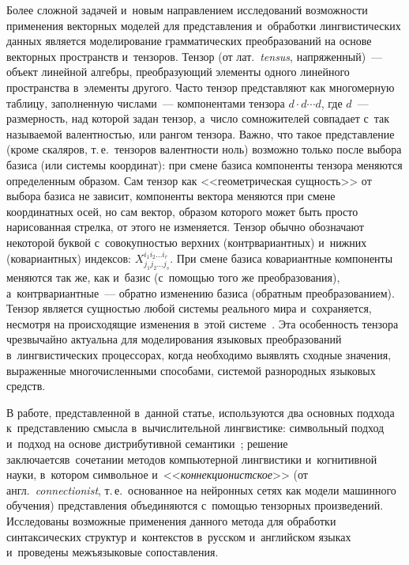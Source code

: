 \begin{multicols}{2}
     Более сложной задачей и~новым направлением исследований 
возможности применения векторных моделей для пред\-став\-ле\-ния и~обработки 
лингвистических данных является моделирование грамматических 
преобразований на основе векторных пространств и~тензоров. Тензор (от 
лат.\ \textit{tensus}, напряженный)~--- объект линейной алгебры, пре\-об\-ра\-зу\-ющий 
элементы одного линейного пространства в~элементы другого. Часто тензор 
представляют как многомерную таб\-ли\-цу, заполненную чис\-ла\-ми~--- 
компонентами тензора $d \cdot d \cdots d$, где $d$~--- раз\-мер\-ность, 
над которой задан тензор, а~чис\-ло сомножителей совпадает с~так называемой 
валентностью, или рангом тензора. Важно, что такое представление (кроме 
скаляров, т.\,е.\ тензоров валентности ноль) возможно только после выбора 
базиса (или системы координат): при смене базиса компоненты тензора 
меняются определенным образом. Сам тензор как <<геометрическая 
сущность>> от выбора базиса не зависит, компоненты вектора меняются при 
смене координатных осей, но сам вектор, образом которого может быть 
прос\-то нарисованная стрелка, от этого не изменяется. Тензор обычно 
обозначают некоторой буквой с~совокупностью верх\-них (контрвариантных) и~ниж\-них (ковариантных) индексов: $X_{j_1 j_2\ldots j_s}^{i_1i_2\ldots i_r}$. 
При смене базиса ковариантные компоненты меняются так же, как и~базис 
(с~по\-мощью того же преобразования), а~контрвариантные~--- обратно 
изменению базиса (обратным преобразованием). Тензор является сущностью 
любой системы реального мира и~сохраняется, несмотря на происходящие 
изменения в~этой системе~\cite{9-koz}. Эта особенность тензора чрезвычайно 
актуальна для моделирования языковых преобразований в~лингвистических 
процессорах, когда необходимо выявлять сходные значения, выраженные 
многочисленными способами, сис\-те\-мой разнородных языковых средств. 
     
     В работе, представленной в~данной статье, используются два основных 
подхода к~пред\-став\-ле\-нию смысла в~вы\-чис\-ли\-тель\-ной лингвистике: 
символьный подход~\cite{10-koz, 11-koz} и~подход на основе 
дистрибутивной семантики~\cite{5-koz, 7-koz, 8-koz, 9-koz}; решение 
заключается\linebreak в~сочетании методов компьютерной лингвистики и~когнитивной 
науки, в~котором символьное и~<<\textit{коннекционистское}>> (от англ.\ 
\textit{connectionist}, т.\,е.\ основанное на нейронных сетях как модели 
машинного обучения) представления объединяются с~по\-мощью тензорных 
произведений. Исследованы возможные применения данного метода для 
обработки синтаксических структур и~контекстов в~русском и~английском 
языках и~проведены межъязыковые сопоставления.
\vspace*{-3pt}
     

\end{multicols}
